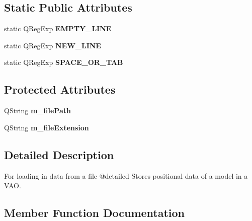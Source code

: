 \subsection*{Static Public Attributes}
\begin{DoxyCompactItemize}
\item 
\mbox{\label{classrev_1_1_file_reader_aa2abe38d7c958e420c036682f2741114}} 
static Q\+Reg\+Exp {\bfseries E\+M\+P\+T\+Y\+\_\+\+L\+I\+NE}
\item 
\mbox{\label{classrev_1_1_file_reader_a2e0d12974483bdf344f5b501400f9d80}} 
static Q\+Reg\+Exp {\bfseries N\+E\+W\+\_\+\+L\+I\+NE}
\item 
\mbox{\label{classrev_1_1_file_reader_ab97612aa73cc2b85894d8bf2038da40a}} 
static Q\+Reg\+Exp {\bfseries S\+P\+A\+C\+E\+\_\+\+O\+R\+\_\+\+T\+AB}
\end{DoxyCompactItemize}
\subsection*{Protected Attributes}
\begin{DoxyCompactItemize}
\item 
\mbox{\label{classrev_1_1_file_reader_af2930ea3ca3495e363cbffd8556147eb}} 
Q\+String {\bfseries m\+\_\+file\+Path}
\item 
\mbox{\label{classrev_1_1_file_reader_a4258bf1b1d291a445d1f4378c332b02f}} 
Q\+String {\bfseries m\+\_\+file\+Extension}
\end{DoxyCompactItemize}


\subsection{Detailed Description}
For loading in data from a file @detailed Stores positional data of a model in a V\+AO. 

\subsection{Member Function Documentation}
\mbox{\label{classrev_1_1_file_reader_ab0717bd108c516abc6fb7c8c7a58e744}} 
